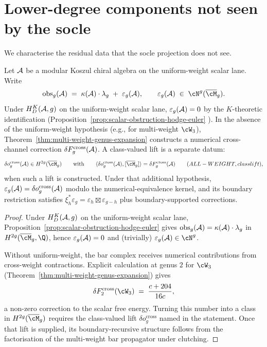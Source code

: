 \section{Lower-degree components not seen by the socle}
\label{sec:lower-degree-components}

We characterise the residual data that the socle projection does
not see.

\begin{proposition}
\label{prop:obs-g-lower-degree-components}
Let $\mathcal{A}$ be a modular Koszul chiral algebra on the uniform-weight
scalar lane. Write
\[
\mathrm{obs}_g(\cA)
\;=\;
\kappa(\cA) \cdot \lambda_g \;+\; \varepsilon_g(\cA),
\qquad
\varepsilon_g(\cA) \;\in\; \cN^g(\overline{\cM}_g).
\]
Under $H_D^K(\mathcal{A},g)$ on the uniform-weight scalar lane,
$\varepsilon_g(\mathcal{A}) = 0$ by the $K$-theoretic identification
\textup{(}Proposition~\ref{prop:scalar-obstruction-hodge-euler}%
\textup{)}. In the absence of the uniform-weight hypothesis (e.g.,
for multi-weight $\cW_3$), Theorem~\textup{\ref{thm:multi-weight-genus-expansion}}
constructs a numerical cross-channel correction
$\delta F_g^{\mathrm{cross}}(\mathcal{A})$. A class-valued lift is a separate
datum:
\[
\delta o_g^{\mathrm{cross}}(\cA)\in H^{2g}(\overline{\cM}_g)
\qquad
\textup{with}\qquad
\langle \delta o_g^{\mathrm{cross}}(\cA),[\overline{\cM}_g]\rangle
=\delta F_g^{\mathrm{cross}}(\cA)
\qquad \textup{(}ALL-WEIGHT, class lift%
\textup{)},
\]
when such a lift is constructed. Under that additional hypothesis,
$\varepsilon_g(\mathcal{A})=\delta o_g^{\mathrm{cross}}(\mathcal{A})$ modulo the
numerical-equivalence kernel, and its boundary restriction satisfies
$\xi_h^*\varepsilon_g = \varepsilon_h\boxtimes\varepsilon_{g-h}$
plus boundary-supported corrections.
\end{proposition}

\begin{proof}
Under $H_D^K(\mathcal{A},g)$ on the uniform-weight scalar lane,
Proposition~\ref{prop:scalar-obstruction-hodge-euler} gives
$\mathrm{obs}_g(\mathcal{A}) = \kappa(\mathcal{A})\cdot\lambda_g$ in
$H^{2g}(\overline{\cM}_g,\Q)$, hence $\varepsilon_g(\mathcal{A}) = 0$
and (trivially) $\varepsilon_g(\cA)\in \cN^g$.

Without uniform-weight, the bar complex receives numerical
contributions from cross-weight contractions. Explicit calculation at
genus $2$ for $\cW_3$
\textup{(}Theorem~\ref{thm:multi-weight-genus-expansion}\textup{)}
gives
\[
\delta F_2^{\mathrm{cross}}(\cW_3) \;=\; \frac{c+204}{16 c},
\]
a non-zero correction to the scalar free energy. Turning this number
into a class in $H^{2g}(\overline{\cM}_g)$ requires the class-valued
lift $\delta o_g^{\mathrm{cross}}$ named in the statement. Once that
lift is supplied, its boundary-recursive structure follows from the
factorisation of the multi-weight bar propagator under clutching.
\end{proof}

